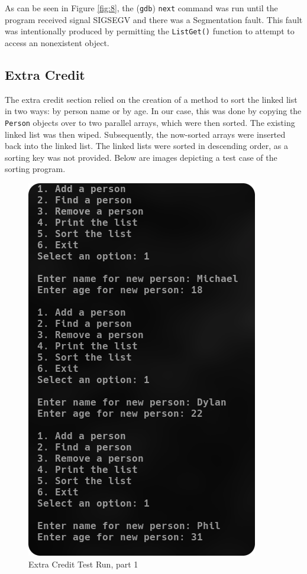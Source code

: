 \documentclass[
	letterpaper, %
	10pt, %
]{CSUniSchoolLabReport}
\begin{document}
As can be seen in Figure \ref{fig:8}, the (\texttt{gdb}) \texttt{next} command was run until the program received signal SIGSEGV and there was a Segmentation fault. This fault was intentionally produced by permitting the \texttt{ListGet()} function to attempt to access an nonexistent object.

\subsection{Extra Credit}

The extra credit section relied on the creation of a method to sort the linked list in two ways: by person name or by age. In our case, this was done by copying the \texttt{Person} objects over to two parallel arrays, which were then sorted. The existing linked list was then wiped. Subsequently, the now-sorted arrays were inserted back into the linked list. The linked lists were sorted in descending order, as a sorting key was not provided. Below are images depicting a test case of the sorting program.

\begin{figure}[H]
  \centering
  \includegraphics[width=.9\textwidth]{Figures/EC1.png}
  \caption{Extra Credit Test Run, part 1}
  \label{fig:1}
\end{figure}
\end{document}
